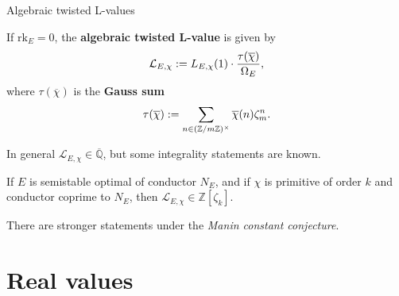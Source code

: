 \documentclass[10pt]{beamer}
\begin{document}
\begin{frame}[t]{Algebraic twisted L-values}

If $ \mathrm{rk}_E = 0 $, the \textbf{algebraic twisted L-value} is given by
\vspace{-0.2cm} $$ \vspace{-0.2cm} \mathcal{L}_{E, \chi} := L_{E, \chi}(1) \cdot \dfrac{\tau(\overline{\chi})}{\Omega_E}, $$
where $ \tau(\overline{\chi}) $ is the \textbf{Gauss sum}
\vspace{-0.2cm} $$ \vspace{-0.2cm} \tau(\overline{\chi}) := \sum_{n \in (\mathbb{Z} / m\mathbb{Z})^\times} \overline{\chi}(n)\zeta_m^n. $$

\pause

In general $ \mathcal{L}_{E, \chi} \in \overline{\mathbb{Q}} $, but some integrality statements are known.

\pause

\vspace{0.5cm}

\begin{theorem}
If $ E $ is semistable optimal of conductor $ N_E $, and if $ \chi $ is primitive of order $ k $ and conductor coprime to $ N_E $, then $ \mathcal{L}_{E, \chi} \in \mathbb{Z}[\zeta_k] $.
\end{theorem}

There are stronger statements under the \emph{Manin constant conjecture}.

\end{frame}

\section{Real values}
\end{document}
